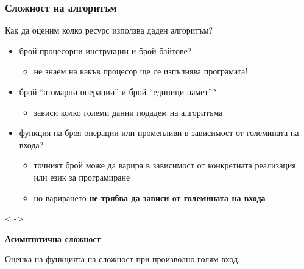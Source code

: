 \documentclass{beamer}
\begin{document}
\begin{frame}
  \frametitle{Сложност на алгоритъм}

  \pause
  \vspace{1em}

  Как да оценим колко ресурс използва даден алгоритъм?
  \begin{itemize}[<+->]
  \item брой процесорни инструкции и брой байтове?
    \begin{itemize}
    \item не знаем на какъв процесор ще се изпълнява програмата!
    \end{itemize}
  \item брой ``атомарни операции'' и брой ``единици памет''?
    \begin{itemize}
    \item зависи колко големи данни подадем на алгоритъма
    \end{itemize}
  \item функция на броя операции или променливи в зависимост от големината на входа?
    \begin{itemize}
    \item точният брой може да варира в зависимост от конкретната реализация или език за програмиране
    \item но варирането \textbf{не трябва да зависи от големината на входа}
    \end{itemize}
  \end{itemize}
  \vspace{1em}

  \onslide<.->{
  \textbf{Асимптотична сложност}

  Оценка на функцията на сложност при произволно голям вход.
  }
\end{frame}
\end{document}
